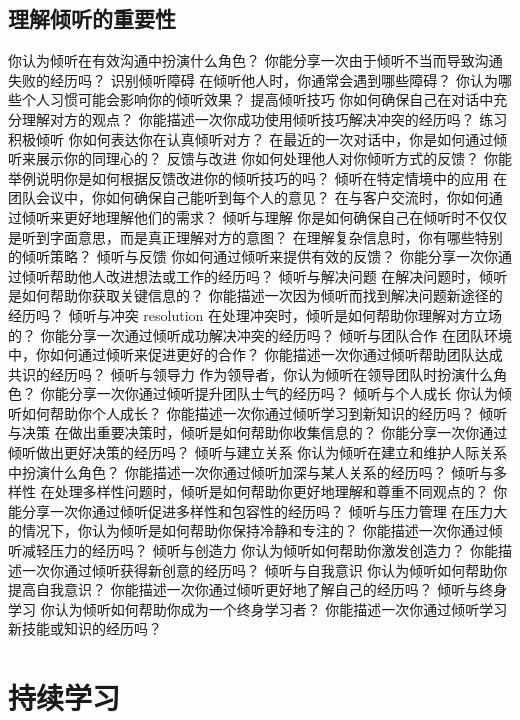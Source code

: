 \documentclass[12pt]{book}
\begin{document}
\subsection{理解倾听的重要性}
你认为倾听在有效沟通中扮演什么角色？
你能分享一次由于倾听不当而导致沟通失败的经历吗？
识别倾听障碍
在倾听他人时，你通常会遇到哪些障碍？
你认为哪些个人习惯可能会影响你的倾听效果？
提高倾听技巧
你如何确保自己在对话中充分理解对方的观点？
你能描述一次你成功使用倾听技巧解决冲突的经历吗？
练习积极倾听
你如何表达你在认真倾听对方？
在最近的一次对话中，你是如何通过倾听来展示你的同理心的？
反馈与改进
你如何处理他人对你倾听方式的反馈？
你能举例说明你是如何根据反馈改进你的倾听技巧的吗？
倾听在特定情境中的应用
在团队会议中，你如何确保自己能听到每个人的意见？
在与客户交流时，你如何通过倾听来更好地理解他们的需求？
倾听与理解
你是如何确保自己在倾听时不仅仅是听到字面意思，而是真正理解对方的意图？
在理解复杂信息时，你有哪些特别的倾听策略？
倾听与反馈
你如何通过倾听来提供有效的反馈？
你能分享一次你通过倾听帮助他人改进想法或工作的经历吗？
倾听与解决问题
在解决问题时，倾听是如何帮助你获取关键信息的？
你能描述一次因为倾听而找到解决问题新途径的经历吗？
倾听与冲突 resolution
在处理冲突时，倾听是如何帮助你理解对方立场的？
你能分享一次通过倾听成功解决冲突的经历吗？
倾听与团队合作
在团队环境中，你如何通过倾听来促进更好的合作？
你能描述一次你通过倾听帮助团队达成共识的经历吗？
倾听与领导力
作为领导者，你认为倾听在领导团队时扮演什么角色？
你能分享一次你通过倾听提升团队士气的经历吗？
倾听与个人成长
你认为倾听如何帮助你个人成长？
你能描述一次你通过倾听学习到新知识的经历吗？
倾听与决策
在做出重要决策时，倾听是如何帮助你收集信息的？
你能分享一次你通过倾听做出更好决策的经历吗？
倾听与建立关系
你认为倾听在建立和维护人际关系中扮演什么角色？
你能描述一次你通过倾听加深与某人关系的经历吗？
倾听与多样性
在处理多样性问题时，倾听是如何帮助你更好地理解和尊重不同观点的？
你能分享一次你通过倾听促进多样性和包容性的经历吗？
倾听与压力管理
在压力大的情况下，你认为倾听是如何帮助你保持冷静和专注的？
你能描述一次你通过倾听减轻压力的经历吗？
倾听与创造力
你认为倾听如何帮助你激发创造力？
你能描述一次你通过倾听获得新创意的经历吗？
倾听与自我意识
你认为倾听如何帮助你提高自我意识？
你能描述一次你通过倾听更好地了解自己的经历吗？
倾听与终身学习
你认为倾听如何帮助你成为一个终身学习者？
你能描述一次你通过倾听学习新技能或知识的经历吗？


\section{持续学习}
\end{document}
